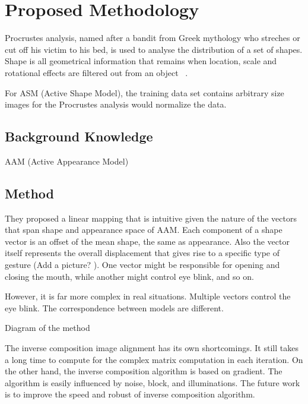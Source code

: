 \chapter{Proposed Methodology}

Procrustes analysis, named after a bandit from Greek mythology who streches or cut off his victim to his bed, is used to analyse the distribution of a set of shapes. Shape is all geometrical information that remains when location, scale and rotational effects are filtered out from an object ~\cite{IMM2002-0403}. 

For ASM (Active Shape Model), the training data set contains arbitrary size images for the Procrustes analysis would normalize the data.

\section{Background Knowledge}
AAM (Active Appearance Model)


\section{Method}

They proposed a linear mapping that is intuitive given the nature of the vectors that span shape and appearance space of AAM. Each component of a shape vector is an offset of the mean shape, the same as appearance. Also the vector itself represents the overall displacement that gives rise to a specific type of gesture (Add a picture? ). One vector might be responsible for opening and closing the mouth, while another might control eye blink, and so on. ~\cite{Theobald07}

However, it is far more complex in real situations. Multiple vectors control the eye blink. The correspondence between models are different. 

Diagram of the method


The inverse composition image alignment has its own shortcomings. It still takes a long time to compute for the complex matrix computation in each iteration. On the other hand, the inverse composition algorithm is based on gradient. The algorithm is easily influenced by noise, block, and illuminations. The future work is to improve the speed and robust of inverse composition algorithm. 